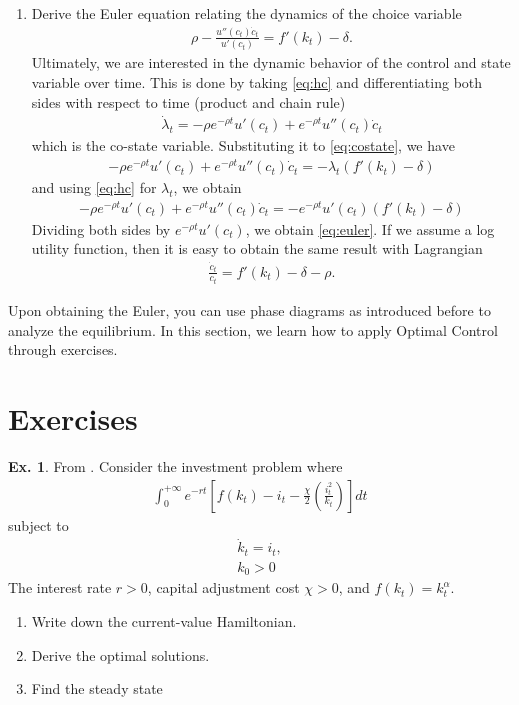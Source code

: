 \documentclass[11pt,a4paper]{book}
\theoremstyle{definition}\newtheorem{definition}{Definition}
\theoremstyle{definition}\newtheorem{fact}{Fact}
\theoremstyle{definition}\newtheorem{remark}{Remark}
\theoremstyle{definition}\newtheorem{ex}{Ex.}
\theoremstyle{definition}\newtheorem{project}{Project}
\theoremstyle{definition}\newtheorem{problem}{Problem}
\theoremstyle{definition}\newtheorem{example}{Example}
\numberwithin{theorem}{section}
\numberwithin{corollary}{chapter}
\numberwithin{assumption}{chapter}
\numberwithin{definition}{chapter}
\numberwithin{prop}{chapter}
\numberwithin{notation}{chapter}
\numberwithin{problem}{chapter}
\numberwithin{example}{chapter}
\numberwithin{fact}{chapter}
\numberwithin{ex}{chapter}
\begin{document}
\begin{enumerate}
		\item Derive the Euler equation relating the dynamics of the choice variable
		\begin{align}
			\rho - \frac{u''(c_t) \dot{c}_t}{u'(c_t)} = f'(k_t) - \delta. \label{eq:euler}
		\end{align}
		Ultimately, we are interested in the dynamic behavior of the control and state variable over time. This is done by taking \eqref{eq:hc} and differentiating both sides with respect to time (product and chain rule)
		\begin{align}
			\dot{\lambda}_t = -\rho e^{-\rho t} u'(c_t) + e^{-\rho t} u''(c_t) \dot{c}_t
		\end{align}
		which is the co-state variable. Substituting it to \eqref{eq:costate}, we have
		\begin{align*}
			-\rho e^{-\rho t} u'(c_t) + e^{-\rho t} u''(c_t) \dot{c}_t = -\lambda_t (f'(k_t)-\delta)
		\end{align*}
		and using \eqref{eq:hc} for $\lambda_t$, we obtain
		\begin{align*}
			-\rho e^{-\rho t} u'(c_t) + e^{-\rho t} u''(c_t) \dot{c}_t = - e^{-\rho t} u'(c_t) (f'(k_t)-\delta)
		\end{align*}
		Dividing both sides by $e^{-\rho t} u'(c_t)$, we obtain \eqref{eq:euler}. If we assume a log utility function, then it is easy to obtain the same result with Lagrangian
		\begin{align*}
			\frac{\dot{c}_t}{c_t} = f'(k_t) - \delta - \rho. 
		\end{align*}
	\end{enumerate}
	Upon obtaining the Euler, you can use phase diagrams as introduced before to analyze the equilibrium. In this section, we learn how to apply Optimal Control through exercises.
	
	\section{Exercises}
	\begin{ex}
		From \cite{michaillat2023}. Consider the investment problem where
		\begin{align*}
			\int^{+\infty}_{0} e^{-r t} \left[ f(k_t) - i_t - \frac{\chi}{2}\left(\frac{i_t^2}{k_t}\right) \right] dt
		\end{align*}
		subject to
		\begin{align*}
			\dot{k}_t = i_t, \\
			k_0 > 0 
		\end{align*}
		The interest rate $r > 0$, capital adjustment cost $\chi > 0$, and $f(k_t) = k_t^\alpha$. 
		\begin{enumerate}
			\item Write down the current-value Hamiltonian.
			\item Derive the optimal solutions.
			\item Find the steady state
		\end{enumerate}
	\end{ex}
	
\end{document}
